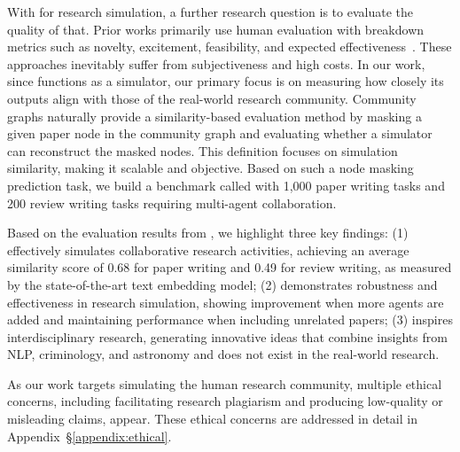 With \envname for research simulation, a further research question is to evaluate the quality of that. Prior works primarily use human evaluation with breakdown metrics such as novelty, excitement, feasibility, and expected effectiveness~\citep{si2024can,hu2024nova}. These approaches inevitably suffer from subjectiveness and high costs. In our work, since \envname functions as a simulator, our primary focus is on measuring how closely its outputs align with those of the real-world research community. Community graphs naturally provide a similarity-based evaluation method by masking a given paper node in the community graph and evaluating whether a simulator can reconstruct the masked nodes. This definition focuses on simulation similarity, making it scalable and objective. Based on such a node masking prediction task, we build a benchmark called \benchname with 1,000 paper writing tasks and 200 review writing tasks requiring multi-agent collaboration.


 Based on the evaluation results from \benchname, we highlight three key findings: (1) \envname effectively simulates collaborative research activities, achieving an average similarity score of 0.68 for paper writing and 0.49 for review writing, as measured by the state-of-the-art text embedding model; (2) \envname demonstrates robustness and effectiveness in research simulation, showing improvement when more agents are added and maintaining performance when including unrelated papers; (3) \envname inspires interdisciplinary research, generating innovative ideas that combine insights from NLP, criminology, and astronomy and does not exist in the real-world research.


 As our work targets simulating the human research community, multiple ethical concerns, including facilitating research plagiarism and producing low-quality or misleading claims, appear. These ethical concerns are addressed in detail in Appendix~\S\ref{appendix:ethical}.

